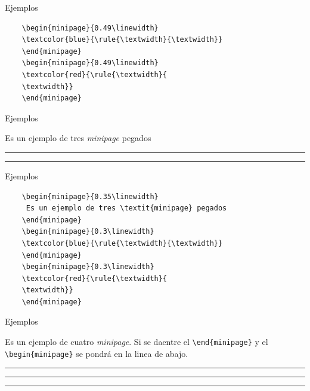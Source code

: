 \documentclass[dvipsnames,xcolor, handout]{beamer}
\theoremstyle{plain}
\theoremstyle{definition}
\begin{document}
\begin{frame}[fragile]{Ejemplos}
\begin{verbatim}
    \begin{minipage}{0.49\linewidth}
    \textcolor{blue}{\rule{\textwidth}{\textwidth}}
    \end{minipage}
    \begin{minipage}{0.49\linewidth}
    \textcolor{red}{\rule{\textwidth}{
    \textwidth}}
    \end{minipage}
\end{verbatim}
\end{frame}

\begin{frame}{Ejemplos}
    \begin{minipage}{0.35\linewidth}
     Es un ejemplo de tres \textit{minipage} pegados
    \end{minipage}
    \begin{minipage}{0.3\linewidth}
    \textcolor{blue}{\rule{\textwidth}{\textwidth}}
    \end{minipage}
    \begin{minipage}{0.3\linewidth}
    \textcolor{red}{\rule{\textwidth}{
    \textwidth}}
    \end{minipage}
\end{frame}

\begin{frame}[fragile]{Ejemplos}
\begin{verbatim}
    \begin{minipage}{0.35\linewidth}
     Es un ejemplo de tres \textit{minipage} pegados
    \end{minipage}
    \begin{minipage}{0.3\linewidth}
    \textcolor{blue}{\rule{\textwidth}{\textwidth}}
    \end{minipage}
    \begin{minipage}{0.3\linewidth}
    \textcolor{red}{\rule{\textwidth}{
    \textwidth}}
    \end{minipage}
\end{verbatim}
\end{frame}

\begin{frame}[fragile]{Ejemplos}
    \begin{minipage}{0.45\linewidth}
     Es un ejemplo de cuatro \textit{minipage}. Si se da\Enter entre el \verb!\end{minipage}! y el \verb!\begin{minipage}! se pondrá en la linea de abajo.
    \end{minipage}
    \begin{minipage}{0.4\linewidth}
    \hfill\textcolor{blue}{\rule{0.8\textwidth}{0.6\textwidth}}
    \end{minipage}\pause
    
    \begin{minipage}{0.25\linewidth}
    \textcolor{orange}{\rule{\textwidth}{0.6\textwidth}}
    \end{minipage}
    \begin{minipage}{0.7\linewidth}
    \textcolor{red}{\rule{\textwidth}{1cm}}
    \end{minipage}
\end{frame}
\end{document}
